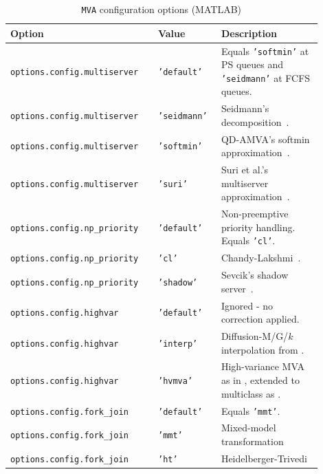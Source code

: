 \begin{MATLAB}
{
\begin{table}[thbp]
\footnotesize
\centering
\caption{\texttt{MVA} configuration options (MATLAB)}
\begin{tabular}{|p{0.42\linewidth}|p{0.18\linewidth}|p{0.3\linewidth}|}
\hline
\textbf{Option} & \textbf{Value} & \textbf{Description}\\
\hline
\texttt{options.config.multiserver} & \texttt{'default'} & Equals \texttt{'softmin'} at PS queues and \texttt{'seidmann'} at FCFS queues.\\
\texttt{options.config.multiserver} & \texttt{'seidmann'} & Seidmann's decomposition~\cite{seidmann1987computerized}.\\
\texttt{options.config.multiserver} & \texttt{'softmin'} & QD-AMVA's softmin approximation~\cite{casale2015qdamva}.\\
\texttt{options.config.multiserver} & \texttt{'suri'} & Suri et al.'s multiserver approximation~\cite{suri2007approximate}.\\
\hline
\texttt{options.config.np\_priority} & \texttt{'default'} & Non-preemptive priority handling. Equals \texttt{'cl'}.\\
\texttt{options.config.np\_priority} & \texttt{'cl'} & Chandy-Lakshmi~\cite{EagL88}.\\
\texttt{options.config.np\_priority} & \texttt{'shadow'} & Sevcik's shadow server~\cite{Sev77}.\\
\hline
\texttt{options.config.highvar} & \texttt{'default'} & Ignored - no correction applied.\\
\texttt{options.config.highvar} & \texttt{'interp'} & Diffusion-M/G/$k$ interpolation from \cite{Casale2020a}.\\
\texttt{options.config.highvar} & \texttt{'hvmva'} & High-variance MVA as in \cite{BonW86}, extended to multiclass as \cite[Eq. 3.21]{Franks1996}.\\
\hline
\texttt{options.config.fork\_join} & \texttt{'default'} & Equals \texttt{'mmt'}. \\
\texttt{options.config.fork\_join} & \texttt{'mmt'} & Mixed-model transformation \cite{dobre24}\\
\texttt{options.config.fork\_join} & \texttt{'ht'} & Heidelberger-Trivedi~\cite{heidelberger1982queueing}\\
\hline
\end{tabular}
\label{TAB_MVA_config}
\end{table}
}
\end{MATLAB}

